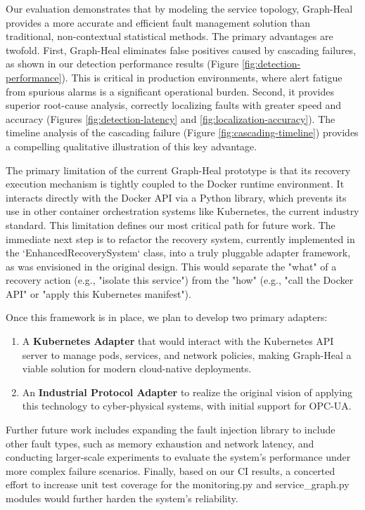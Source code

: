 \documentclass[11pt,conference]{IEEEtran}
\begin{document}
Our evaluation demonstrates that by modeling the service topology, Graph-Heal provides a more accurate and efficient fault management solution than traditional, non-contextual statistical methods. The primary advantages are twofold. First, Graph-Heal eliminates false positives caused by cascading failures, as shown in our detection performance results (Figure \ref{fig:detection-performance}). This is critical in production environments, where alert fatigue from spurious alarms is a significant operational burden. Second, it provides superior root-cause analysis, correctly localizing faults with greater speed and accuracy (Figures \ref{fig:detection-latency} and \ref{fig:localization-accuracy}). The timeline analysis of the cascading failure (Figure \ref{fig:cascading-timeline}) provides a compelling qualitative illustration of this key advantage.

The primary limitation of the current Graph-Heal prototype is that its recovery execution mechanism is tightly coupled to the Docker runtime environment. It interacts directly with the Docker API via a Python library, which prevents its use in other container orchestration systems like Kubernetes, the current industry standard. This limitation defines our most critical path for future work. The immediate next step is to refactor the recovery system, currently implemented in the `EnhancedRecoverySystem` class, into a truly pluggable adapter framework, as was envisioned in the original design. This would separate the "what" of a recovery action (e.g., "isolate this service") from the "how" (e.g., "call the Docker API" or "apply this Kubernetes manifest").

Once this framework is in place, we plan to develop two primary adapters:
\begin{enumerate}
    \item A \textbf{Kubernetes Adapter} that would interact with the Kubernetes API server to manage pods, services, and network policies, making Graph-Heal a viable solution for modern cloud-native deployments.
    \item An \textbf{Industrial Protocol Adapter} to realize the original vision of applying this technology to cyber-physical systems, with initial support for OPC-UA.
\end{enumerate}

Further future work includes expanding the fault injection library to include other fault types, such as memory exhaustion and network latency, and conducting larger-scale experiments to evaluate the system's performance under more complex failure scenarios. Finally, based on our CI results, a concerted effort to increase unit test coverage for the monitoring.py and service\_graph.py modules would further harden the system's reliability.
\end{document}
